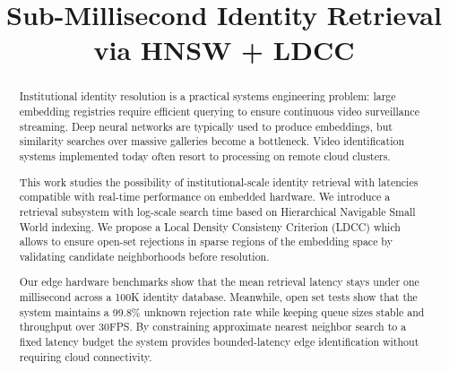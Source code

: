 \documentclass[conference]{IEEEtran}
\begin{document}
\title{Sub-Millisecond Identity Retrieval via HNSW + LDCC}

\author{
}

\maketitle

\begin{abstract}
Institutional identity resolution is a practical systems engineering problem: large embedding registries require efficient querying to ensure continuous video surveillance streaming. Deep neural networks are typically used to produce embeddings, but similarity searches over massive galleries become a bottleneck. Video identification systems implemented today often resort to processing on remote cloud clusters.

This work studies the possibility of institutional-scale identity retrieval with latencies compatible with real-time performance on embedded hardware. We introduce a retrieval subsystem with log-scale search time based on Hierarchical Navigable Small World indexing. We propose a Local Density Consisteny Criterion (LDCC) which allows to ensure open-set rejections in sparse regions of the embedding space by validating candidate neighborhoods before resolution.

Our edge hardware benchmarks show that the mean retrieval latency stays under one millisecond across a 100K identity database. Meanwhile, open set tests show that the system maintains a 99.8\% unknown rejection rate while keeping queue sizes stable and throughput over 30FPS. By constraining approximate nearest neighbor search to a fixed latency budget the system provides bounded-latency edge identification without requiring cloud connectivity.
\end{abstract}
\end{document}
